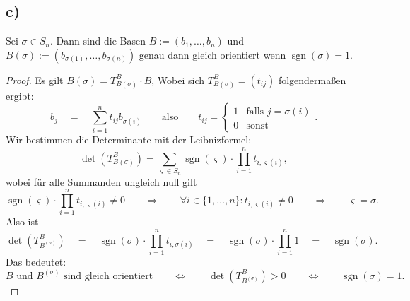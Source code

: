 \documentclass{article}
\newcommand{\imp}{\mathbb{\Rightarrow}}
\newcommand{\equ}{\mathbb{\Leftrightarrow}}
\newcommand{\eq}{\mathbb{\quad = \quad}}
\DeclareMathOperator{\sgn}{sgn}
\begin{document}
\subsection*{c)}
Sei $\sigma \in S_n$.
Dann sind die Basen $B := (b_1, \ldots, b_n)$
und $B(\sigma) := (b_{\sigma(1)}, \ldots, b_{\sigma(n)})$
genau dann gleich orientiert wenn
$\sgn(\sigma) = 1$.

\begin{proof}
  Es gilt
  $B(\sigma) = T^B_{B(\sigma)} \cdot B$,
  Wobei sich
  $T^B_{B(\sigma)} = (t_{ij})$
  folgendermaßen ergibt:
  \[
    b_j \eq \sum_{i=1}^{n} t_{ij} b_{\sigma(i)}
    \qquad\text{also}\qquad
    t_{ij} = \begin{cases*}
      1 & \text{falls $j = \sigma(i)$} \\
      0 & \text{sonst}
    \end{cases*}.
  \]
  Wir bestimmen die Determinante mit der Leibnizformel:
  \[
    \det(T^B_{B(\sigma)})
    =
    \sum_{\varsigma \in S_n} \sgn(\varsigma) \cdot \prod_{i = 1}^{n} t_{i,\varsigma(i)},
  \]
  wobei für alle Summanden ungleich null gilt
  \[
    \sgn(\varsigma) \cdot \prod_{i = 1}^{n} t_{i,\varsigma(i)} \neq 0
    \qquad\imp\qquad
    \forall i \in \{1, \ldots, n\} : t_{i, \varsigma(i)} \neq 0
    \qquad\imp\qquad
    \varsigma = \sigma.
  \]
  Also ist
  \[
    \det(T^B_{B^{(\sigma)}})
    \eq
    \sgn(\sigma) \cdot \prod_{i = 1}^{n} t_{i,\sigma(i)}
    \eq
    \sgn(\sigma) \cdot \prod_{i = 1}^{n} 1
    \eq
    \sgn(\sigma).\]
  Das bedeutet:
  \[
    \text{$B$ und $B^{(\sigma)}$ sind gleich orientiert}
    \qquad\equ\qquad
    \det(T^B_{B^{(\sigma)}}) > 0
    \qquad\equ\qquad
    \sgn(\sigma) = 1.
  \]
\end{proof}
\end{document}
